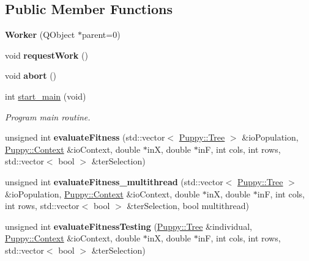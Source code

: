 \subsection*{Public Member Functions}
\begin{DoxyCompactItemize}
\item 
\hypertarget{classWorker_a3290234525f8aad4f10f73305c9d1859}{}{\bfseries Worker} (Q\+Object $\ast$parent=0)\label{classWorker_a3290234525f8aad4f10f73305c9d1859}

\item 
\hypertarget{classWorker_a7def095438777bfa3c3b7adc3ada8481}{}void {\bfseries request\+Work} ()\label{classWorker_a7def095438777bfa3c3b7adc3ada8481}

\item 
\hypertarget{classWorker_a6ae95a49a7955d3efd052f27652c563a}{}void {\bfseries abort} ()\label{classWorker_a6ae95a49a7955d3efd052f27652c563a}

\item 
int \hyperlink{classWorker_a22bc35b7fff1c4cc8deb9a6b0a433c07}{start\+\_\+main} (void)
\begin{DoxyCompactList}\small\item\em Program main routine. \end{DoxyCompactList}\item 
\hypertarget{classWorker_a2c4efdf17d01c375f4aa390679827371}{}unsigned int {\bfseries evaluate\+Fitness} (std\+::vector$<$ \hyperlink{classPuppy_1_1Tree}{Puppy\+::\+Tree} $>$ \&io\+Population, \hyperlink{classPuppy_1_1Context}{Puppy\+::\+Context} \&io\+Context, double $\ast$in\+X, double $\ast$in\+F, int cols, int rows, std\+::vector$<$ bool $>$ \&ter\+Selection)\label{classWorker_a2c4efdf17d01c375f4aa390679827371}

\item 
\hypertarget{classWorker_af5bc25e98c2bb4d6aca90c1de5d3aa9b}{}unsigned int {\bfseries evaluate\+Fitness\+\_\+multithread} (std\+::vector$<$ \hyperlink{classPuppy_1_1Tree}{Puppy\+::\+Tree} $>$ \&io\+Population, \hyperlink{classPuppy_1_1Context}{Puppy\+::\+Context} \&io\+Context, double $\ast$in\+X, double $\ast$in\+F, int cols, int rows, std\+::vector$<$ bool $>$ \&ter\+Selection, bool multithread)\label{classWorker_af5bc25e98c2bb4d6aca90c1de5d3aa9b}

\item 
\hypertarget{classWorker_a8deae4f62f500e7f7ac353e2a46656f4}{}unsigned int {\bfseries evaluate\+Fitness\+Testing} (\hyperlink{classPuppy_1_1Tree}{Puppy\+::\+Tree} \&individual, \hyperlink{classPuppy_1_1Context}{Puppy\+::\+Context} \&io\+Context, double $\ast$in\+X, double $\ast$in\+F, int cols, int rows, std\+::vector$<$ bool $>$ \&ter\+Selection)\label{classWorker_a8deae4f62f500e7f7ac353e2a46656f4}


\end{DoxyCompactItemize}
